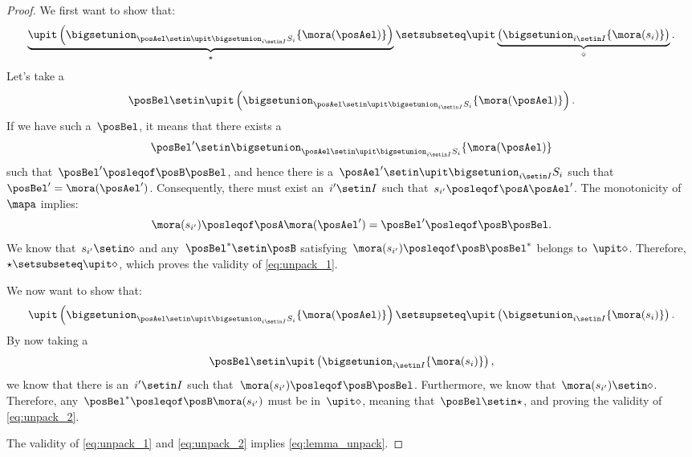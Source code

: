 \begin{proof}
    We first want to show that:
    \begin{equation}
        \label{eq:unpack_1}
        \underbrace{\upit \left(\bigsetunion_{\posAel \setin \upit \bigsetunion_{i\setin I}S_i}\{\mora(\posAel)\} \right)}_{\star}\setsubseteq \upit \underbrace{\left( \bigsetunion_{i\setin I}\{\mora(s_i)\}\right)}_{\diamond}.
    \end{equation}
    Let's take a
    \begin{equation}
        \posBel \setin \upit\left( \bigsetunion_{\posAel \setin \upit \bigsetunion_{i\setin I}S_i}\{\mora(\posAel)\}\right).
    \end{equation}
    If we have such a~$\posBel$, it means that there exists a
    \begin{equation}
        \posBel'\setin \bigsetunion_{\posAel\setin \upit\bigsetunion_{i\setin I}S_i}\{\mora(\posAel)\}
    \end{equation}
    such that~$\posBel'\posleqof\posB \posBel$, and hence there is a~$\posAel'\setin \upit \bigsetunion_{i\setin I} S_i$ such that~$\posBel'=\mora(\posAel')$.
    Consequently, there must exist an~$i'\setin I$ such that~$s_{i'}\posleqof\posA \posAel'$.
    The monotonicity of~$\mapa$ implies:
    \begin{equation}
        \mora(s_{i'})\posleqof\posA \mora(\posAel')=\posBel'\posleqof\posB \posBel.
    \end{equation}
    We know that~$s_{i'}\setin \diamond$ and any~$\posBel^*\setin \posB$ satisfying~$\mora(s_{i'})\posleqof\posB \posBel^*$ belongs to~$\upit \diamond$.
    Therefore,~$\star\setsubseteq \upit \diamond$, which proves the validity of \cref{eq:unpack_1}.

    We now want to show that:
    \begin{equation}
        \label{eq:unpack_2}
        \upit \left(\bigsetunion_{\posAel \setin \upit \bigsetunion_{i\setin I}S_i}\{\mora(\posAel)\} \right)\setsupseteq \upit \left( \bigsetunion_{i\setin I}\{\mora(s_i)\}\right).
    \end{equation}
    By now taking a
    \begin{equation}
        \posBel\setin \upit \left( \bigsetunion_{i\setin I}\{\mora(s_i)\}\right),
    \end{equation}
    we know that there is an~$i'\setin I$ such that~$\mora(s_{i'})\posleqof\posB \posBel$.
    Furthermore, we know that~$\mora(s_{i'})\setin \diamond$.
    Therefore, any~$\posBel^*\posleqof\posB \mora(s_{i'})$ must be in~$\upit \diamond$, meaning that~$\posBel\setin \star$, and proving the validity of \cref{eq:unpack_2}.

    The validity of \cref{eq:unpack_1} and \cref{eq:unpack_2} implies \cref{eq:lemma_unpack}.
\end{proof}

